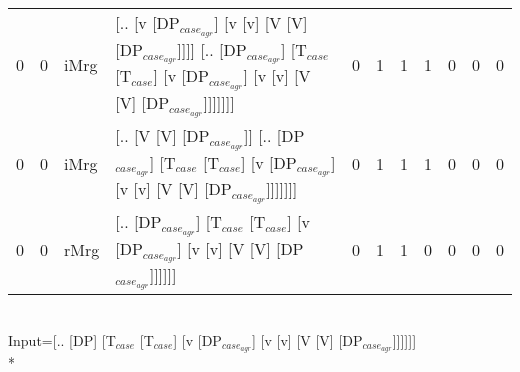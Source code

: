 \begin{tabularx}{\linewidth}{rrlXrrrrrrr}
   0 &   0 & iMrg & [.. [v [DP$_{case_{agr}}$] [v [v] [V [V] [DP$_{case_{agr}}$]]]] [.. [DP$_{case_{agr}}$] [T$_{case}$ [T$_{case}$] [v [DP$_{case_{agr}}$] [v [v] [V [V] [DP$_{case_{agr}}$]]]]]]]                   &            0 &             1 &             1 &                  1 &              0 &                0 &              0 \\
   0 &   0 & iMrg & [.. [V [V] [DP$_{case_{agr}}$]] [.. [DP$_{case_{agr}}$] [T$_{case}$ [T$_{case}$] [v [DP$_{case_{agr}}$] [v [v] [V [V] [DP$_{case_{agr}}$]]]]]]]                                             &            0 &             1 &             1 &                  1 &              0 &                0 &              0 \\
   0 &   0 & rMrg & [.. [DP$_{case_{agr}}$] [T$_{case}$ [T$_{case}$] [v [DP$_{case_{agr}}$] [v [v] [V [V] [DP$_{case_{agr}}$]]]]]]                                                                        &            0 &             1 &             1 &                  0 &              0 &                0 &              0 \\
\hline
\end{tabularx}\endgroup\\
\begingroup\scriptsize Input=[.. [DP] [T$_{case}$ [T$_{case}$] [v [DP$_{case_{agr}}$] [v [v] [V [V] [DP$_{case_{agr}}$]]]]]]\\*
